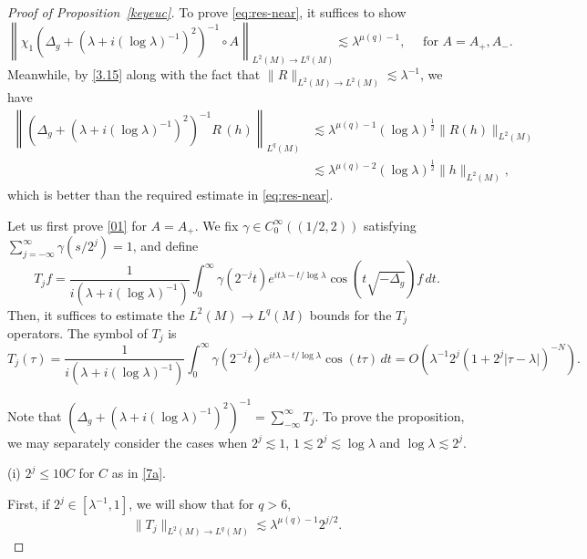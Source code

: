 \documentclass[11pt]{amsart}
\newcommand{\la}{\lambda}
\begin{document}
\begin{proof}[Proof of Proposition~\ref{keyeuc}]
To prove \eqref{eq:res-near}, it suffices to show 
\begin{equation}\label{01}
    \left\|\chi_1\left(\Delta_g+(\la+i(\log\la)^{-1})^2\right)^{-1}\circ A\right\|_{L^2(M)\to L^q(M)}\lesssim \la^{\mu(q)-1}, \quad \text{ for } A=A_+, A_-.
\end{equation}
{{
Meanwhile, by \eqref{3.15} along with the fact that $\|R\|_{L^2(M)\to L^2(M)}\lesssim\la^{-1}$, we have
\begin{equation}\label{n12b}
\begin{aligned}
       \left\|\left(\Delta_g+(\la+i(\log\la)^{-1})^2\right)^{-1} R \,(h)\right\|_{ L^q(M)}&\lesssim \la^{\mu(q)-1}(\log\la)^{\frac12}\|R( h)\|_{L^2( M)}\\
       &\lesssim 
   \la^{\mu(q)-2}(\log\la)^{\frac12} \| h\|_{L^2( M)},
\end{aligned}
\end{equation}
which is better than the required estimate in \eqref{eq:res-near}.}}

Let us first prove \eqref{01} for $A=A_+$.  
We fix $\gamma\in C_0^\infty ((1/2, 2))$ satisfying $\sum_{j=-\infty}^\infty \gamma(s/2^j)=1$, and 
define 
\begin{equation}\label{tj}
T_j f=\frac1{i(\la+i(\log\la)^{-1})}\int_0^\infty \gamma(2^{-j}t)e^{it\la-t/\log\la}\cos (t\sqrt{-\Delta_g})f\,dt.
\end{equation}
Then, it suffices to estimate the $L^2(M)\to L^q(M)$ bounds for the $T_j$ operators.  The symbol of $T_j$ is 
\begin{equation}\label{symbol}
    T_j(\tau)=\frac1{i(\la+i(\log\la)^{-1})}\int_0^\infty \gamma(2^{-j}t)e^{it\la-t/\log\la}\cos (t\tau)\,dt=O(\la^{-1}2^j(1+2^j|\tau-\la|)^{-N}).
\end{equation}



Note that $(\Delta_g+(\la+i(\log\la)^{-1})^2)^{-1}=\sum_{-\infty}^\infty T_j$.  To prove the proposition, we may separately consider the cases when
$2^j\lesssim  1$, $1\lesssim  2^j\lesssim \log \la$ and $\log\la \lesssim 2^j$.


\noindent(i) $2^j\le 10C$ for $C$ as in \eqref{7a}.

First, if $2^j\in[\la^{-1},1]$, we will show that for
$q>6$,
\begin{equation}\label{tjbound1}
    \|T_j\|_{L^2(M)\to L^q(M)}
    \lesssim
    \la^{\mu(q)-1}2^{j/2}.
\end{equation}


\end{proof}
\end{document}
